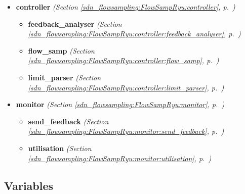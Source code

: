 \begin{itemize}
\setlength{\parskip}{0ex}
\item \textbf{controller}
  \textit{(Section \ref{sdn_flowsampling:FlowSampRyu:controller}, p.~\pageref{sdn_flowsampling:FlowSampRyu:controller})}

  \begin{itemize}
\setlength{\parskip}{0ex}
    \item \textbf{feedback\_analyser}
  \textit{(Section \ref{sdn_flowsampling:FlowSampRyu:controller:feedback_analyser}, p.~\pageref{sdn_flowsampling:FlowSampRyu:controller:feedback_analyser})}

    \item \textbf{flow\_samp}
  \textit{(Section \ref{sdn_flowsampling:FlowSampRyu:controller:flow_samp}, p.~\pageref{sdn_flowsampling:FlowSampRyu:controller:flow_samp})}

    \item \textbf{limit\_parser}
  \textit{(Section \ref{sdn_flowsampling:FlowSampRyu:controller:limit_parser}, p.~\pageref{sdn_flowsampling:FlowSampRyu:controller:limit_parser})}

  \end{itemize}
\item \textbf{monitor}
  \textit{(Section \ref{sdn_flowsampling:FlowSampRyu:monitor}, p.~\pageref{sdn_flowsampling:FlowSampRyu:monitor})}

  \begin{itemize}
\setlength{\parskip}{0ex}
    \item \textbf{send\_feedback}
  \textit{(Section \ref{sdn_flowsampling:FlowSampRyu:monitor:send_feedback}, p.~\pageref{sdn_flowsampling:FlowSampRyu:monitor:send_feedback})}

    \item \textbf{utilisation}
  \textit{(Section \ref{sdn_flowsampling:FlowSampRyu:monitor:utilisation}, p.~\pageref{sdn_flowsampling:FlowSampRyu:monitor:utilisation})}

  \end{itemize}
\end{itemize}



  \subsection{Variables}

